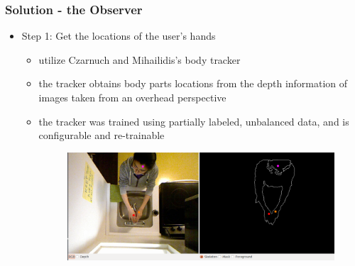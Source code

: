 \documentclass{beamer}
\begin{document}
\begin{frame}
\frametitle{Solution - the Observer}
\begin{itemize}
\item Step 1: Get the locations of the user's hands
\begin{itemize}
\item utilize Czarnuch and Mihailidis's body tracker \cite{czarnuch2014}
\item the tracker obtains body parts locations from the depth information of images taken from an overhead perspective
\item the tracker was trained using partially labeled, unbalanced data, and is configurable and re-trainable\\
\pause
\begin{figure}[htb]
\centering
\includegraphics[width=0.9\linewidth]{fig/handtracker-performance.png}
\end{figure}
\end{itemize}
\end{itemize}
\end{frame}
\end{document}
